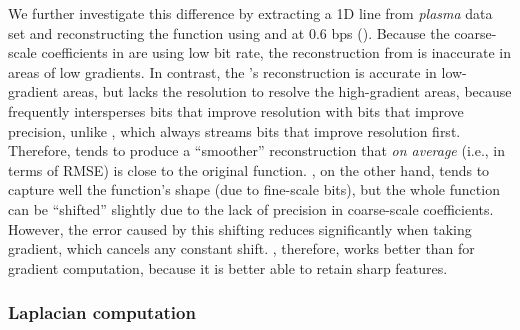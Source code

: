 We further investigate this difference by extracting a 1D line from \emph{plasma} data set and reconstructing
the function using \sbit and \swav at 0.6 bps (). Because the
coarse-scale coefficients in \sbit are using low bit rate, the reconstruction from \sbit is
inaccurate in areas of low gradients. In contrast, the \swav's reconstruction is accurate in
low-gradient areas, but lacks the resolution to resolve the high-gradient areas, because \swav
frequently intersperses bits that improve resolution with bits that improve precision, unlike \sbit,
which always streams bits that improve resolution first. Therefore, \swav tends to produce a
``smoother'' reconstruction that \emph{on average} (i.e., in terms of RMSE) is close to the original
function. \sbit, on the other hand, tends to capture well the function's shape (due to fine-scale
bits), but the whole function can be ``shifted'' slightly due to the lack of precision in
coarse-scale coefficients. However, the error caused by this shifting reduces significantly when
taking gradient, which cancels any constant shift. \sbit, therefore, works better than \swav for
gradient computation, because it is better able to retain sharp features.


\subsubsection{Laplacian computation}\label{sec:laplacian}

